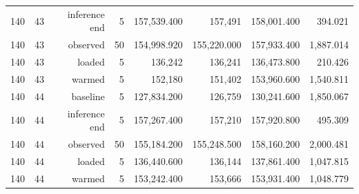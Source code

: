 \documentclass[10pt,a4paper]{article}
\begin{document}
\begin{longtable}{@{}lrrrrrrr@{}}
140 & 43 & inference end & 5 & 157,539.400 & 157,491 & 158,001.400 & 394.021 \\
140 & 43 & observed & 50 & 154,998.920 & 155,220.000 & 157,933.400 & 1,887.014 \\
140 & 43 & loaded & 5 & 136,242 & 136,241 & 136,473.800 & 210.426 \\
140 & 43 & warmed & 5 & 152,180 & 151,402 & 153,960.600 & 1,540.811 \\
140 & 44 & baseline & 5 & 127,834.200 & 126,759 & 130,241.600 & 1,850.067 \\
140 & 44 & inference end & 5 & 157,267.400 & 157,210 & 157,920.800 & 495.309 \\
140 & 44 & observed & 50 & 155,184.200 & 155,248.500 & 158,160.200 & 2,000.481 \\
140 & 44 & loaded & 5 & 136,440.600 & 136,144 & 137,861.400 & 1,047.815 \\
140 & 44 & warmed & 5 & 153,242.400 & 153,666 & 153,931.400 & 1,048.779 \\
\end{longtable}\endgroup
\begingroup\small\setlength{\tabcolsep}{4pt}\renewcommand{\arraystretch}{1.12}
\end{document}
